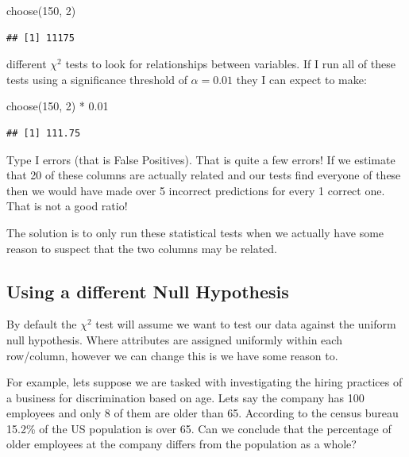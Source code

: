 \documentclass[
]{book}
\newenvironment{Shaded}{\begin{snugshade}}{\end{snugshade}}
\newcommand{\DecValTok}[1]{\textcolor[rgb]{0.00,0.00,0.81}{#1}}
\newcommand{\FloatTok}[1]{\textcolor[rgb]{0.00,0.00,0.81}{#1}}
\newcommand{\FunctionTok}[1]{\textcolor[rgb]{0.00,0.00,0.00}{#1}}
\newcommand{\NormalTok}[1]{#1}
\newcommand{\SpecialCharTok}[1]{\textcolor[rgb]{0.00,0.00,0.00}{#1}}
\theoremstyle{definition}
\theoremstyle{definition}
\theoremstyle{definition}
\theoremstyle{definition}
\theoremstyle{remark}
\begin{document}
\begin{Shaded}
\begin{Highlighting}[]
\FunctionTok{choose}\NormalTok{(}\DecValTok{150}\NormalTok{, }\DecValTok{2}\NormalTok{)}
\end{Highlighting}
\end{Shaded}

\begin{verbatim}
## [1] 11175
\end{verbatim}

different \(\chi^2\) tests to look for relationships between variables. If I run all of these tests using a significance threshold of \(\alpha=0.01\) they I can expect to make:

\begin{Shaded}
\begin{Highlighting}[]
\FunctionTok{choose}\NormalTok{(}\DecValTok{150}\NormalTok{, }\DecValTok{2}\NormalTok{) }\SpecialCharTok{*} \FloatTok{0.01}
\end{Highlighting}
\end{Shaded}

\begin{verbatim}
## [1] 111.75
\end{verbatim}

Type I errors (that is False Positives). That is quite a few errors! If we estimate that 20 of these columns are actually related and our tests find everyone of these then we would have made over 5 incorrect predictions for every 1 correct one. That is not a good ratio!

The solution is to only run these statistical tests when we actually have some reason to suspect that the two columns may be related.

\hypertarget{using-a-different-null-hypothesis}{%
\subsection{Using a different Null Hypothesis}\label{using-a-different-null-hypothesis}}

By default the \(\chi^2\) test will assume we want to test our data against the uniform null hypothesis. Where attributes are assigned uniformly within each row/column, however we can change this is we have some reason to.

For example, lets suppose we are tasked with investigating the hiring practices of a business for discrimination based on age. Lets say the company has 100 employees and only 8 of them are older than 65. According to the census bureau 15.2\% of the US population is over 65. Can we conclude that the percentage of older employees at the company differs from the population as a whole?
\end{document}
